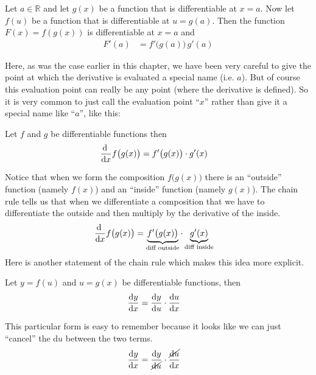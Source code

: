 \begin{theorem}
\label{thm:DIFFchainRuleV1}
  Let $a \in \mathbb{R}$ and let $g(x)$ be a function that is differentiable at
$x=a$. Now let $f(u)$ be a function that is differentiable at
$u=g(a)$. Then the function $F(x) = f(g(x))$ is differentiable at $x=a$ and
\begin{align*}
  F'(a) &=f'\big(g(a)\big)\,g'(a)
\end{align*}
\end{theorem}
Here, as was the case earlier in this chapter,  we have been very
careful to give the point at which the derivative is evaluated a special
name (i.e. $a$). But of course this evaluation point can really be
any point (where the derivative is defined).
So it is very common to just call the evaluation point ``$x$'' rather
than give it a special name like ``$a$'', like this:
\begin{theorem}
\label{thm:DIFFchainRuleV2}
 Let $f$ and $g$ be differentiable functions then
  \begin{align*}
  \diff{}{x} f\big( g( x) \big) &= f'\big(g(x)\big) \cdot g'(x)
\end{align*}
\end{theorem}
Notice that when we form the composition $f\big(g(x)\big)$ there
is an ``outside'' function (namely $f(x)$) and an ``inside'' function
(namely $g(x)$). The chain rule tells us that when we differentiate
a composition that we have to differentiate the outside and then
multiply by the derivative of the inside.
\begin{align*}
  \diff{}{x} f\big( g( x) \big)
   &= \underbrace{f'\big(g(x)\big)}_\text{diff outside} \cdot
                          \underbrace{g'(x)}_\text{diff inside}
\end{align*}
Here is another statement of the chain rule which makes this idea more
explicit.


\begin{theorem}
\label{thm:DIFFchainRuleV3}
  Let $y = f(u)$ and $u = g(x)$ be differentiable functions, then
  \begin{align*}
  \diff{y}{x} &= \diff{y}{u} \cdot \diff{u}{x}
\end{align*}
\end{theorem}
This particular form is easy to remember because it looks like we can just
``cancel'' the $\mathrm{d}u$ between the two terms.
  \begin{align*}
  \diff{y}{x} &= \frac{\mathrm{d}{y}}{\cancel{\mathrm{d}u}} \cdot
\frac{\cancel{\mathrm{d}{u}}}{\mathrm{d}x}
\end{align*}

